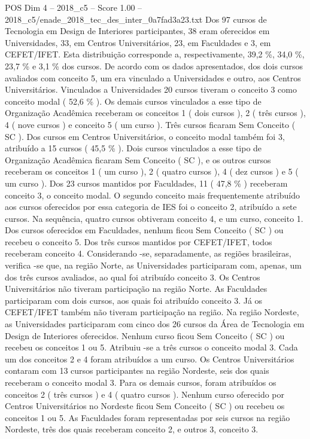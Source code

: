 \begin{textsample}{POS Dim 4 – 2018\_c5 – Score 1.00 – 2018\_c5/enade\_2018\_tec\_des\_inter\_0a7fad3a23.txt}
Dos 97 cursos de Tecnologia em Design de Interiores participantes, 38 eram oferecidos em Universidades, 33, em Centros Universitários, 23, em Faculdades e 3, em CEFET/IFET.
Esta distribuição corresponde a, respectivamente, 39,2 \%, 34,0 \%, 23,7 \% e 3,1 \% dos cursos.
De acordo com os dados apresentados, dos dois cursos avaliados com conceito 5, um era vinculado a Universidades e outro, aos Centros Universitários.
Vinculados a Universidades 20 cursos tiveram o conceito 3 como conceito modal ( 52,6 \% ).
Os demais cursos vinculados a esse tipo de Organização Acadêmica receberam os conceitos 1 ( dois cursos ), 2 ( três cursos ), 4 ( nove cursos ) e conceito 5 ( um curso ).
Três cursos ficaram Sem Conceito ( SC ).
Dos cursos em Centros Universitários, o conceito modal também foi 3, atribuído a 15 cursos ( 45,5 \% ).
Dois cursos vinculados a esse tipo de Organização Acadêmica ficaram Sem Conceito ( SC ), e os outros cursos receberam os conceitos 1 ( um curso ), 2 ( quatro cursos ), 4 ( dez cursos ) e 5 ( um curso ).
Dos 23 cursos mantidos por Faculdades, 11 ( 47,8 \% ) receberam conceito 3, o conceito modal.
O segundo conceito mais frequentemente atribuído aos cursos oferecidos por essa categoria de IES foi o conceito 2, atribuído a sete cursos.
Na sequência, quatro cursos obtiveram conceito 4, e um curso, conceito 1.
Dos cursos oferecidos em Faculdades, nenhum ficou Sem Conceito ( SC ) ou recebeu o conceito 5.
Dos três cursos mantidos por CEFET/IFET, todos receberam conceito 4.
Considerando -se, separadamente, as regiões brasileiras, verifica -se que, na região Norte, as Universidades participaram com, apenas, um dos três cursos avaliados, ao qual foi atribuído conceito 3.
Os Centros Universitários não tiveram participação na região Norte.
As Faculdades participaram com dois cursos, aos quais foi atribuído conceito 3.
Já os CEFET/IFET também não tiveram participação na região.
Na região Nordeste, as Universidades participaram com cinco dos 26 cursos da Área de Tecnologia em Design de Interiores oferecidos.
Nenhum curso ficou Sem Conceito ( SC ) ou recebeu os conceitos 1 ou 5.
Atribuiu -se a três cursos o conceito modal 3.
Cada um dos conceitos 2 e 4 foram atribuídos a um curso.
Os Centros Universitários contaram com 13 cursos participantes na região Nordeste, seis dos quais receberam o conceito modal 3.
Para os demais cursos, foram atribuídos os conceitos 2 ( três cursos ) e 4 ( quatro cursos ).
Nenhum curso oferecido por Centros Universitários no Nordeste ficou Sem Conceito ( SC ) ou recebeu os conceitos 1 ou 5.
As Faculdades foram representadas por seis cursos na região Nordeste, três dos quais receberam conceito 2, e outros 3, conceito 3.

\end{textsample}
